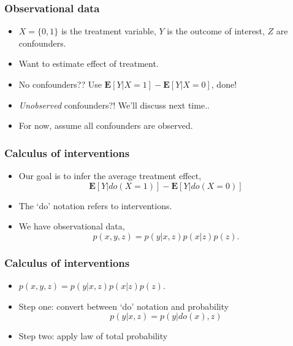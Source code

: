 \documentclass{beamer}
\newcommand{\E}{\textbf{E}}
\begin{document}
\begin{frame}
\frametitle{Observational data}
\begin{center}
\end{center}
\begin{itemize}
\item $X = \{0, 1\}$ is the treatment variable, $Y$ is the outcome of interest, $Z$ are confounders.
\item Want to estimate effect of treatment.
\item No confounders?? Use $\E[Y|X=1] - \E[Y|X = 0]$, done!
\item \emph{Unobserved} confounders?!  We'll discuss next time..
\item For now, assume all confounders are observed.
\end{itemize}
\end{frame}

\begin{frame}
\frametitle{Calculus of interventions}
\begin{itemize}
\item Our goal is to infer the average treatment effect,
\[
\E[Y|do(X=1)] - \E[Y|do(X = 0)]
\]
\item The `do' notation refers to interventions.
\item We have observational data,
\[p(x, y, z) = p(y|x,z)p(x|z)p(z).\]
\end{itemize}
\begin{center}
\end{center}

\end{frame}

\begin{frame}
\frametitle{Calculus of interventions}
\begin{itemize}
\item $p(x, y, z) = p(y|x,z)p(x|z)p(z).$
\item Step one: convert between `do' notation and probability
\[
p(y | x, z) = p(y | do(x), z)
\]
\item Step two: apply law of total probability
\end{itemize}
\end{frame}
\end{document}
